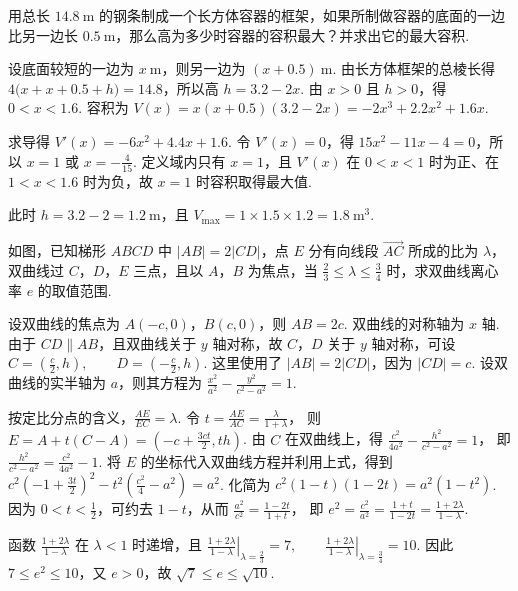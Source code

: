 \begin{problem}
用总长 \(14.8 \mathrm{~m}\) 的钢条制成一个长方体容器的框架，如果所制做容器的底面的一边比另一边长 \(0.5 \mathrm{~m}\)，那么高为多少时容器的容积最大？并求出它的最大容积.
\end{problem}

\begin{solution}
设底面较短的一边为 \(x\mathrm{~m}\)，则另一边为 \((x+0.5)\mathrm{~m}\). 由长方体框架的总棱长得
\(
4\bigl(x+x+0.5+h\bigr)=14.8
\)，所以高
\(
h=3.2-2x
\).
由 \(x>0\) 且 \(h>0\)，得 \(0<x<1.6\). 容积为
\(
V(x)=x(x+0.5)(3.2-2x)
=-2x^{3}+2.2x^{2}+1.6x
\).

求导得
\(
V'(x)=-6x^{2}+4.4x+1.6
\).
令 \(V'(x)=0\)，得
\(
15x^{2}-11x-4=0
\)，所以 \(x=1\) 或 \(x=-\frac{4}{15}\). 定义域内只有 \(x=1\)，且 \(V'(x)\) 在 \(0<x<1\) 时为正、在 \(1<x<1.6\) 时为负，故 \(x=1\) 时容积取得最大值.

此时
\(
h=3.2-2=1.2\mathrm{~m}
\)，且
\(
V_{\max}=1\times1.5\times1.2=1.8\mathrm{~m}^{3}
\).
\end{solution}

\begin{problem}
如图，已知梯形 \(ABCD\) 中 \(|AB| = 2|CD|\)，点 \(E\) 分有向线段 \(\overrightarrow{AC}\) 所成的比为 \(\lambda\)，双曲线过 \(C\)，\(D\)，\(E\) 三点，且以 \(A\)，\(B\) 为焦点，当 \(\frac{2}{3} \leqslant \lambda \leqslant \frac{3}{4}\) 时，求双曲线离心率 \(e\) 的取值范围.

\end{problem}

\begin{solution}
设双曲线的焦点为 \(A(-c,0)\)，\(B(c,0)\)，则 \(AB=2c\). 双曲线的对称轴为 \(x\) 轴. 由于 \(CD\parallel AB\)，且双曲线关于 \(y\) 轴对称，故 \(C\)，\(D\) 关于 \(y\) 轴对称，可设
\(
C=\left(\frac{c}{2},h\right),\qquad D=\left(-\frac{c}{2},h\right)
\).
这里使用了 \(|AB|=2|CD|\)，因为 \(|CD|=c\). 设双曲线的实半轴为 \(a\)，则其方程为
\(
\frac{x^{2}}{a^{2}}-\frac{y^{2}}{c^{2}-a^{2}}=1
\).

按定比分点的含义，\(\frac{AE}{EC}=\lambda\). 令
\(
t=\frac{AE}{AC}=\frac{\lambda}{1+\lambda}
\)，
则
\(
E=A+t(C-A)=\left(-c+\frac{3ct}{2},th\right)
\).
由 \(C\) 在双曲线上，得
\(
\frac{c^{2}}{4a^{2}}-\frac{h^{2}}{c^{2}-a^{2}}=1
\)，
即
\(
\frac{h^{2}}{c^{2}-a^{2}}=\frac{c^{2}}{4a^{2}}-1
\).
将 \(E\) 的坐标代入双曲线方程并利用上式，得到
\(
c^{2}\left(-1+\frac{3t}{2}\right)^{2}
-t^{2}\left(\frac{c^{2}}{4}-a^{2}\right)=a^{2}
\).
化简为
\(
c^{2}(1-t)(1-2t)=a^{2}(1-t^{2})
\).
因为 \(0<t<\frac12\)，可约去 \(1-t\)，从而
\(
\frac{a^{2}}{c^{2}}=\frac{1-2t}{1+t}
\)， 即
\(
e^{2}=\frac{c^{2}}{a^{2}}=\frac{1+t}{1-2t}
=\frac{1+2\lambda}{1-\lambda}
\).

函数 \(\frac{1+2\lambda}{1-\lambda}\) 在 \(\lambda<1\) 时递增，且
\(
\left.\frac{1+2\lambda}{1-\lambda}\right|_{\lambda=\frac23}=7,\qquad
\left.\frac{1+2\lambda}{1-\lambda}\right|_{\lambda=\frac34}=10
\).
因此
\(
7\leqslant e^{2}\leqslant10
\)，又 \(e>0\)，故
\(
\sqrt{7}\leqslant e\leqslant\sqrt{10}
\).
\end{solution}
